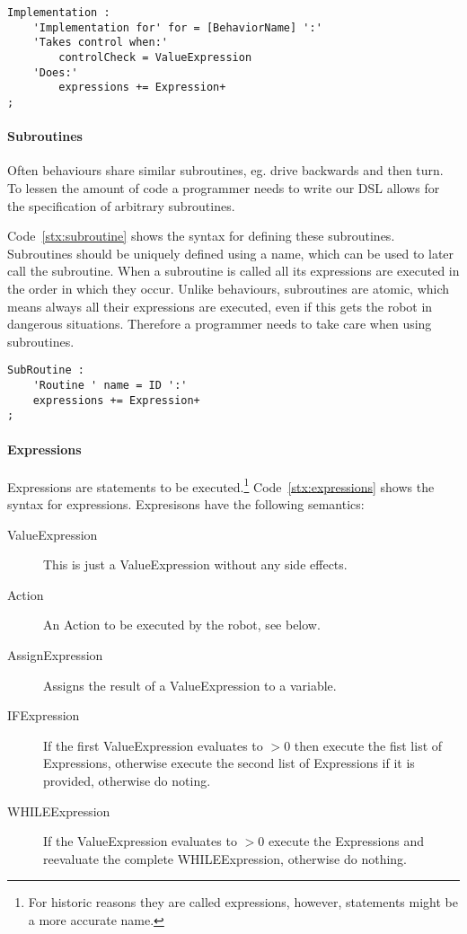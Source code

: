 \begin{lstlisting}[caption=Syntax for implementing behaviours, label=stx:implementation]
Implementation :
    'Implementation for' for = [BehaviorName] ':'
    'Takes control when:'
        controlCheck = ValueExpression
    'Does:'
        expressions += Expression+
;
\end{lstlisting}

\paragraph{Subroutines} Often behaviours share similar subroutines, eg. drive
backwards and then turn. To lessen the amount of code a programmer needs to 
write our DSL allows for the specification of arbitrary subroutines.

Code~\ref{stx:subroutine} shows the syntax for defining these subroutines. 
Subroutines should be uniquely defined using a name, which can be used to later 
call the subroutine. When a subroutine is called all its expressions are
executed in the order in which they occur. Unlike behaviours, subroutines are 
atomic, which means always all their expressions are executed, even if this gets
the robot in dangerous situations. Therefore a programmer needs to take care 
when using subroutines.

\begin{lstlisting}[caption=Syntax for subroutine definition, label=stx:subroutine]
SubRoutine :
    'Routine ' name = ID ':'
    expressions += Expression+
;
\end{lstlisting}

\paragraph{Expressions} Expressions are statements to be executed.\footnote{
For historic reasons they are called expressions, however, statements might
be a more accurate name.} Code~\ref{stx:expressions} shows the syntax for 
expressions. Expresisons have the following semantics:

\begin{description}
    \item[ValueExpression] This is just a ValueExpression without any side 
            effects.
    \item[Action] An Action to be executed by the robot, see below.
    \item[AssignExpression] Assigns the result of a ValueExpression to a
            variable.
    \item[IFExpression] If the first ValueExpression evaluates to $>0$ then
            execute the fist list of Expressions, otherwise execute the second
            list of Expressions if it is provided, otherwise do noting.
    \item[WHILEExpression] If the ValueExpression evaluates to $>0$ execute
            the Expressions and reevaluate the complete WHILEExpression, 
            otherwise do nothing. 
\end{description}

